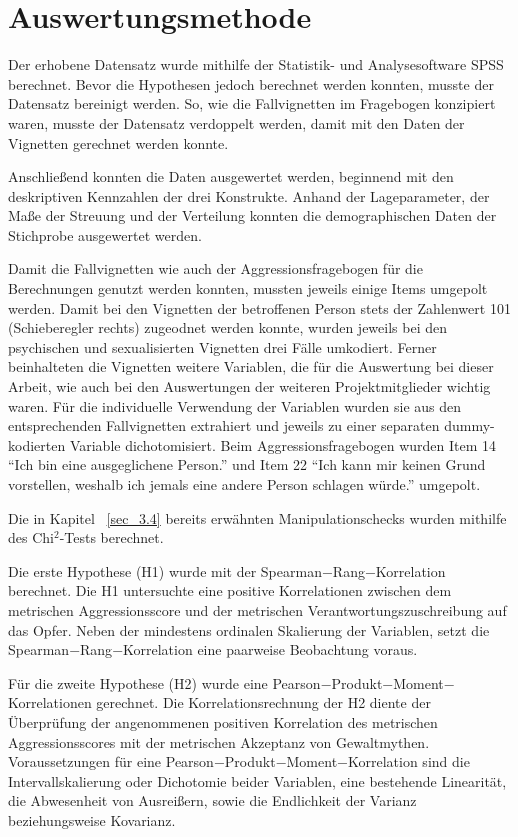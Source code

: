 \section{Auswertungsmethode}    \label{sec_3.5}
Der erhobene Datensatz wurde mithilfe der Statistik- und Analysesoftware SPSS\textsuperscript{\textregistered} berechnet. Bevor die Hypothesen jedoch berechnet werden konnten, musste der Datensatz bereinigt werden. So, wie die Fallvignetten im Fragebogen konzipiert waren, musste der Datensatz verdoppelt werden, damit mit den Daten der Vignetten gerechnet werden konnte. 

Anschließend konnten die Daten ausgewertet werden, beginnend mit den deskriptiven Kennzahlen der drei Konstrukte. Anhand der Lageparameter, der Maße der Streuung und der Verteilung konnten die demographischen Daten der Stichprobe ausgewertet werden.

Damit die Fallvignetten wie auch der Aggressionsfragebogen für die Berechnungen genutzt werden konnten, mussten jeweils einige Items umgepolt werden. Damit bei den Vignetten der betroffenen Person stets der Zahlenwert 101 (Schieberegler rechts) zugeodnet werden konnte, wurden jeweils bei den psychischen und sexualisierten Vignetten drei Fälle umkodiert. Ferner beinhalteten die Vignetten weitere Variablen, die für die Auswertung bei dieser Arbeit, wie auch bei den Auswertungen der weiteren Projektmitglieder wichtig waren. Für die individuelle Verwendung der Variablen wurden sie aus den entsprechenden Fallvignetten extrahiert und jeweils zu einer separaten dummy-kodierten Variable dichotomisiert. Beim Aggressionsfragebogen wurden Item 14 \enquote{Ich bin eine ausgeglichene Person.} und Item 22 \enquote{Ich kann mir keinen Grund vorstellen, weshalb ich jemals eine andere Person schlagen würde.} umgepolt.

Die in Kapitel ~\ref{sec_3.4} bereits erwähnten Manipulationschecks wurden mithilfe des Chi$^2$-Tests berechnet.

Die erste Hypothese (H1) wurde mit der Spearman$-$Rang$-$Korrelation berechnet. Die H1 untersuchte eine positive Korrelationen zwischen dem metrischen Aggressionsscore und der metrischen Verantwortungszuschreibung auf das Opfer. Neben der mindestens ordinalen Skalierung der Variablen, setzt die Spearman$-$Rang$-$Korrelation eine paarweise Beobachtung voraus.  

Für die zweite Hypothese (H2) wurde eine Pearson$-$Produkt$-$Moment$-$Korrelationen gerechnet. Die Korrelationsrechnung der H2 diente der Überprüfung der angenommenen positiven Korrelation des metrischen Aggressionsscores mit der metrischen Akzeptanz von Gewaltmythen. Voraussetzungen für eine Pearson$-$Produkt$-$Moment$-$Korrelation sind die Intervallskalierung oder Dichotomie beider Variablen, eine bestehende Linearität, die Abwesenheit von Ausreißern, sowie die Endlichkeit der Varianz beziehungsweise Kovarianz.

